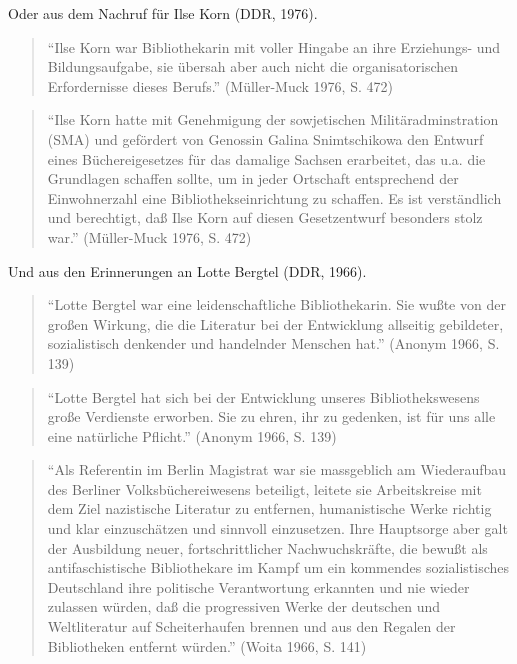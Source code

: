 \documentclass[a4paper,
fontsize=11pt,
oneside,
numbers=noperiodatend,
parskip=half-,
bibliography=totoc,
final
]{scrartcl}
\begin{document}
Oder aus dem Nachruf für Ilse Korn (DDR, 1976).

\begin{quote}
\enquote{Ilse Korn war Bibliothekarin mit voller Hingabe an ihre
Erziehungs- und Bildungsaufgabe, sie übersah aber auch nicht die
organisatorischen Erfordernisse dieses Berufs.} (Müller-Muck 1976, S.
472)
\end{quote}

\begin{quote}
\enquote{Ilse Korn hatte mit Genehmigung der sowjetischen
Militäradminstration (SMA) und gefördert von Genossin Galina
Snimtschikowa den Entwurf eines Büchereigesetzes für das damalige
Sachsen erarbeitet, das u.a. die Grundlagen schaffen sollte, um in jeder
Ortschaft entsprechend der Einwohnerzahl eine Bibliothekseinrichtung zu
schaffen. Es ist verständlich und berechtigt, daß Ilse Korn auf diesen
Gesetzentwurf besonders stolz war.} (Müller-Muck 1976, S. 472)
\end{quote}

Und aus den Erinnerungen an Lotte Bergtel (DDR, 1966).

\begin{quote}
\enquote{Lotte Bergtel war eine leidenschaftliche Bibliothekarin. Sie
wußte von der großen Wirkung, die die Literatur bei der Entwicklung
allseitig gebildeter, sozialistisch denkender und handelnder Menschen
hat.} (Anonym 1966, S. 139)
\end{quote}

\begin{quote}
\enquote{Lotte Bergtel hat sich bei der Entwicklung unseres
Bibliothekswesens große Verdienste erworben. Sie zu ehren, ihr zu
gedenken, ist für uns alle eine natürliche Pflicht.} (Anonym 1966, S.
139)
\end{quote}

\begin{quote}
\enquote{Als Referentin im Berlin Magistrat war sie massgeblich am
Wiederaufbau des Berliner Volksbüchereiwesens beteiligt, leitete sie
Arbeitskreise mit dem Ziel nazistische Literatur zu entfernen,
humanistische Werke richtig und klar einzuschätzen und sinnvoll
einzusetzen. Ihre Hauptsorge aber galt der Ausbildung neuer,
fortschrittlicher Nachwuchskräfte, die bewußt als antifaschistische
Bibliothekare im Kampf um ein kommendes sozialistisches Deutschland ihre
politische Verantwortung erkannten und nie wieder zulassen würden, daß
die progressiven Werke der deutschen und Weltliteratur auf
Scheiterhaufen brennen und aus den Regalen der Bibliotheken entfernt
würden.} (Woita 1966, S. 141)
\end{quote}
\end{document}
